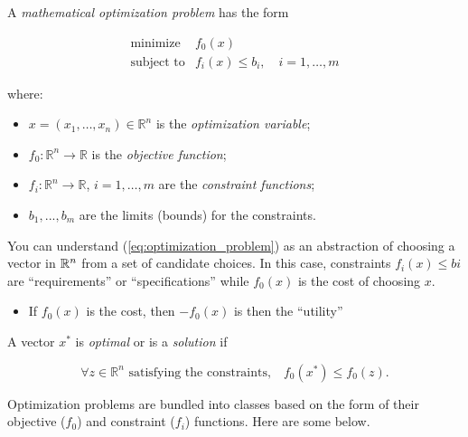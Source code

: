 


A \textit{mathematical optimization problem} has the form

\begin{equation}\label{eq:opt_problem}
  \begin{array}{rl}
    \text{minimize} & f_0(x) \\
    \text{subject to} & f_i(x)\le b_i,\quad i=1,\ldots,m
  \end{array}
\end{equation}

where:

\begin{itemize}
\item $x=(x_1,\ldots,x_n)\in\mathbb R^n$ is the \textit{optimization variable};
\item $f_0:\mathbb R^n\to\mathbb R$ is the \textit{objective function};
\item $f_i:\mathbb R^n\to \mathbb R$, $i=1,\ldots,m$ are the \textit{constraint functions};
\item $b_1,...,b_m$ are the limits (bounds) for the constraints.
\end{itemize}

\begin{Fact}
You can understand (\ref{eq:optimization_problem}) as an abstraction of choosing a vector in $\mathbb R^n$ from a set of candidate choices. In this case, constraints $f_i(x)\le bi$ are ``requirements'' or ``specifications'' while $f_0(x)$ is the cost of choosing $x$.

\begin{itemize}
\item If $f_0(x)$ is the cost, then $-f_0(x)$ is then the ``utility''
\end{itemize}
\end{Fact}

\begin{Definition}
A vector $x^*$ is \textit{optimal} or is a \textit{solution} if

\begin{equation*}
  \forall z\in\mathbb R^n\text{ satisfying the constraints,}\quad f_0(x^*)\le f_0(z).
\end{equation*}
\end{Definition}


Optimization problems are bundled into classes based on the form of their objective ($f_0$) and constraint ($f_i$) functions. Here are some below.

